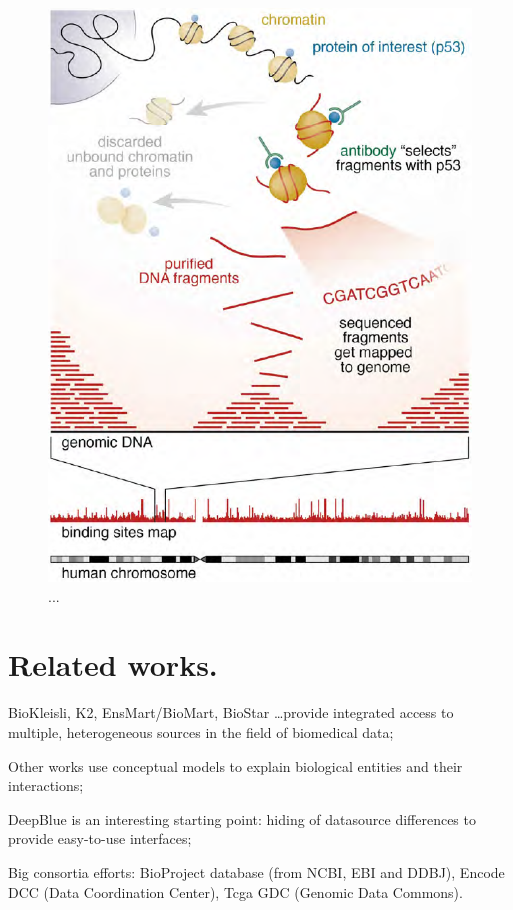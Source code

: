 \documentclass[journal]{IEEEtran}
\begin{document}
\begin{figure}
  \includegraphics[width=\linewidth]{chip-seq_workflow}
  \caption{...}
  \label{fig:chipseq}
\end{figure}

\section{Related works.}
BioKleisli, K2, EnsMart/BioMart, BioStar \ldots provide integrated access to multiple, heterogeneous sources in the field of biomedical data;

Other works use conceptual models to explain biological entities and their interactions;

DeepBlue is an interesting starting point:  hiding of datasource differences to provide easy-to-use interfaces;

Big consortia efforts: BioProject database (from NCBI, EBI and DDBJ), Encode DCC (Data Coordination Center), Tcga GDC (Genomic Data Commons).
\end{document}
